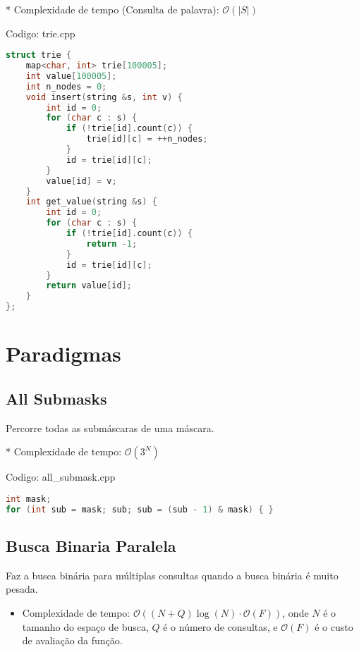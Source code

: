 \documentclass[10pt, a4paper, oneside]{book}
\begin{document}
* Complexidade de tempo (Consulta de palavra): $\mathcal{O}(|S|)$

\hfill

Codigo: trie.cpp

\begin{lstlisting}[language=C++]
struct trie {
    map<char, int> trie[100005];
    int value[100005];
    int n_nodes = 0;
    void insert(string &s, int v) {
        int id = 0;
        for (char c : s) {
            if (!trie[id].count(c)) {
                trie[id][c] = ++n_nodes;
            }
            id = trie[id][c];
        }
        value[id] = v;
    }
    int get_value(string &s) {
        int id = 0;
        for (char c : s) {
            if (!trie[id].count(c)) {
                return -1;
            }
            id = trie[id][c];
        }
        return value[id];
    }
};
\end{lstlisting}
\hfill

\newpage

%
%
%
%

\chapter{Paradigmas}

\section{All Submasks}


Percorre todas as submáscaras de uma máscara.



* Complexidade de tempo: $\mathcal{O}(3^N)$

\hfill

Codigo: all\_submask.cpp

\begin{lstlisting}[language=C++]
int mask;
for (int sub = mask; sub; sub = (sub - 1) & mask) { }
\end{lstlisting}
\hfill

\section{Busca Binaria Paralela}


Faz a busca binária para múltiplas consultas quando a busca binária é muito pesada.



\begin{itemize}
\item Complexidade de tempo: $\mathcal{O}((N+Q) \log(N) \cdot \mathcal{O}(F))$, onde \(N\) é o tamanho do espaço de busca, \(Q\) é o número de consultas, e \(\mathcal{O}(F)\) é o custo de avaliação da função.
\end{itemize}
\end{document}
